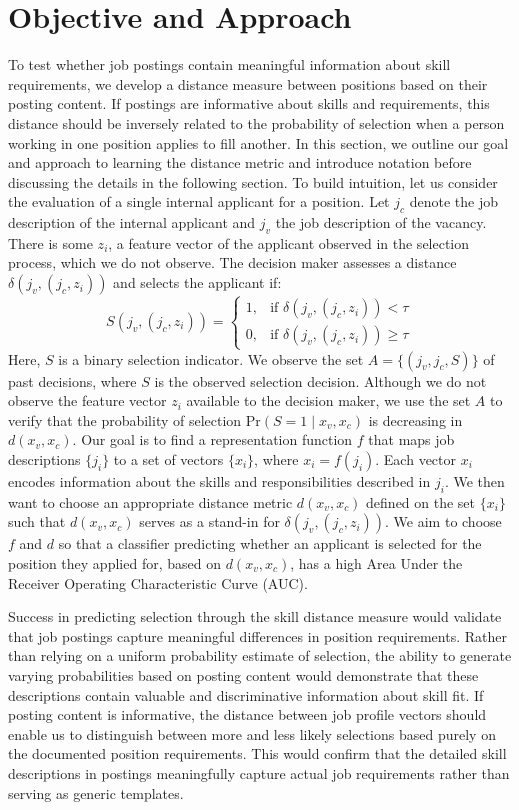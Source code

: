 
\section{Objective and Approach}\label{sec:objective_approach}

To test whether job postings contain meaningful information about skill requirements, we develop a distance measure between positions based on their posting content. If postings are informative about skills and requirements, this distance should be inversely related to the probability of selection when a person working in one position applies to fill another. In this section, we outline our goal and approach to learning the distance metric and introduce notation before discussing the details in the following section. To build intuition, let us consider the evaluation of a single internal applicant for a position. Let \(j_c\) denote the job description of the internal applicant and \(j_v\) the job description of the vacancy. There is some \(z_i\), a feature vector of the applicant observed in the selection process, which we do not observe. The decision maker assesses a distance \(\delta(j_v, (j_c, z_i))\) and selects the applicant if:
\[
S(j_v, (j_c, z_i)) = 
\begin{cases} 
1, & \text{if } \delta(j_v, (j_c, z_i)) < \tau \\
0, & \text{if } \delta(j_v, (j_c, z_i)) \geq \tau
\end{cases}
\]
Here, \(S\) is a binary selection indicator. We observe the set \(A = \{(j_v, j_c, S)\}\) of past decisions, where \(S\) is the observed selection decision. Although we do not observe the feature vector \(z_i\) available to the decision maker, we use the set \(A\) to verify that the probability of selection \(\text{Pr}(S = 1 \mid x_v, x_c)\) is decreasing in \(d(x_v, x_c)\). Our goal is to find a representation function \(f\) that maps job descriptions \(\{j_i\}\) to a set of vectors \(\{x_i\}\), where \(x_i = f(j_i)\). Each vector \(x_i\) encodes information about the skills and responsibilities described in \(j_i\). We then want to choose an appropriate distance metric \(d(x_v, x_c)\) defined on the set \(\{x_i\}\) such that \(d(x_v, x_c)\) serves as a stand-in for \(\delta(j_v, (j_c, z_i))\). We aim to choose \(f\) and \(d\) so that a classifier predicting whether an applicant is selected for the position they applied for, based on \(d(x_v, x_c)\), has a high Area Under the Receiver Operating Characteristic Curve (AUC).


Success in predicting selection through the skill distance measure would validate that job postings capture meaningful differences in position requirements. Rather than relying on a uniform probability estimate of selection, the ability to generate varying probabilities based on posting content would demonstrate that these descriptions contain valuable and discriminative information about skill fit. If posting content is informative, the distance between job profile vectors should enable us to distinguish between more and less likely selections based purely on the documented position requirements. This would confirm that the detailed skill descriptions in postings meaningfully capture actual job requirements rather than serving as generic templates.


